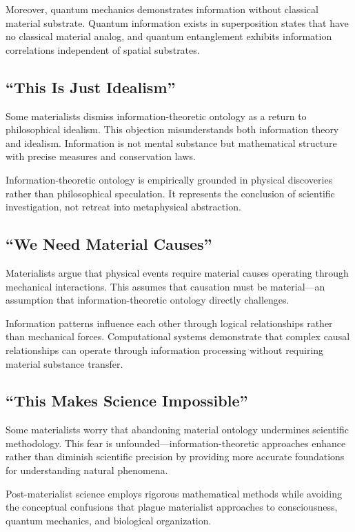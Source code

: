 \documentclass[12pt]{article}
\begin{document}
Moreover, quantum mechanics demonstrates information without classical material substrate. Quantum information exists in superposition states that have no classical material analog, and quantum entanglement exhibits information correlations independent of spatial substrates.

\subsection{``This Is Just Idealism''}

Some materialists dismiss information-theoretic ontology as a return to philosophical idealism. This objection misunderstands both information theory and idealism. Information is not mental substance but mathematical structure with precise measures and conservation laws.

Information-theoretic ontology is empirically grounded in physical discoveries rather than philosophical speculation. It represents the conclusion of scientific investigation, not retreat into metaphysical abstraction.

\subsection{``We Need Material Causes''}

Materialists argue that physical events require material causes operating through mechanical interactions. This assumes that causation must be material—an assumption that information-theoretic ontology directly challenges.

Information patterns influence each other through logical relationships rather than mechanical forces. Computational systems demonstrate that complex causal relationships can operate through information processing without requiring material substance transfer.

\subsection{``This Makes Science Impossible''}

Some materialists worry that abandoning material ontology undermines scientific methodology. This fear is unfounded—information-theoretic approaches enhance rather than diminish scientific precision by providing more accurate foundations for understanding natural phenomena.

Post-materialist science employs rigorous mathematical methods while avoiding the conceptual confusions that plague materialist approaches to consciousness, quantum mechanics, and biological organization.
\end{document}
